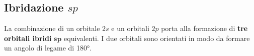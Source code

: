 \begin{center}

\end{center}

\subsection{Ibridazione \texorpdfstring{\(sp\)}{sp}}
La combinazione di un orbitale \(2s\) e un orbitali \(2p\) porta alla formazione di \textbf{tre orbitali ibridi} \(\mathbf{sp}\) equivalenti. I due orbitali sono orientati in modo da formare un angolo di legame di \ang{180}.

\begin{center}
\end{center}

\endgroup


